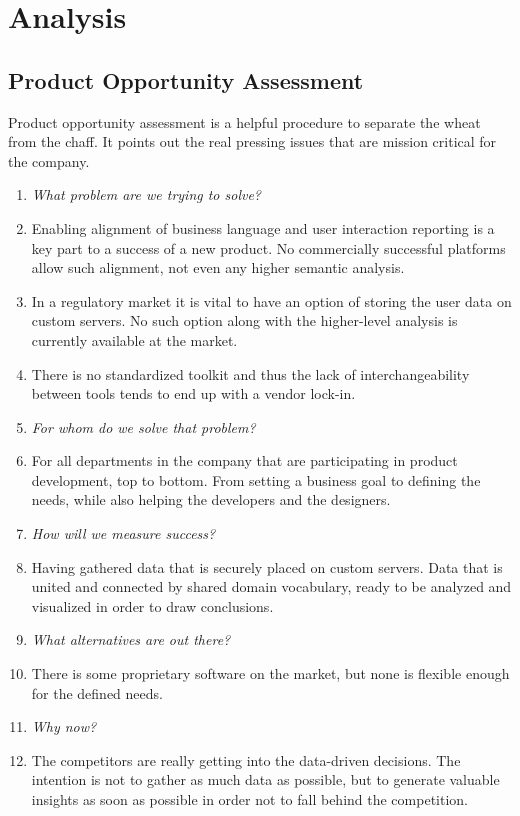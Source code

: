 \chapter{Analysis}

\section{Product Opportunity Assessment}

Product opportunity assessment is a helpful procedure to separate the wheat from the chaff. It points out the real pressing issues that are mission critical for the company.

\begin{enumerate}
	\item \emph{What problem are we trying to solve?}
	\item[] Enabling alignment of business language and user interaction reporting is a key part to a success of a new product. No commercially successful platforms allow such alignment, not even any higher semantic analysis. 
	\item[] In a regulatory market it is vital to have an option of storing the user data on custom servers. No such option along with the higher-level analysis is currently available at the market.
	\item[] There is no standardized toolkit and thus the lack of interchangeability between tools tends to end up with a vendor lock-in.
	
	\item \emph{For whom do we solve that problem?}
	\item[] 	For all departments in the company that are participating in product development, top to bottom. From setting a business goal to defining the needs, while also helping the developers and the designers.
	
	\item \emph{How will we measure success?}
	\item[] Having gathered data that is securely placed on custom servers. Data that is united and connected by shared domain vocabulary, ready to be analyzed and visualized in order to draw conclusions.

	\item \emph{What alternatives are out there?}
	\item[] There is some proprietary software on the market, but none is flexible enough for the defined needs.

	\item \emph{Why now?}
	\item[] The competitors \cite{data-driven-pharma} are really getting into the data-driven decisions. The intention is not to gather as much data as possible, but to generate valuable insights as soon as possible in order not to fall behind the competition.


\end{enumerate}
